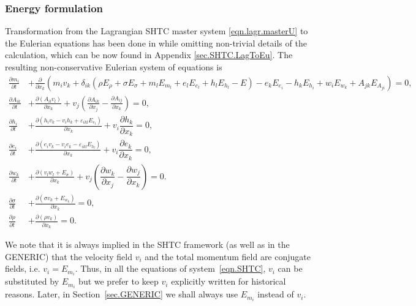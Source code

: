 \documentclass[twoside]{article}
\newcommand{\ted}{E} %
\newcommand{\pd}{\partial}
\begin{document}
\subsubsection{Energy formulation}

Transformation from the Lagrangian SHTC master system 
\eqref{eqn.lagr.masterU} to the Eulerian equations has been done in 
\cite{GodRom1996a} while omitting non-trivial details of the calculation, which 
can be now
found in Appendix \ref{sec.SHTC.LagToEu}. The resulting non-conservative 
Eulerian system of 
equations is
\begin{subequations}\label{eqn.SHTC}
	\begin{align}
	\frac{\pd m_i }{\pd t} & + \frac{\pd }{\pd 
	x_k}\left(m_i v_k + \delta_{ik} \left( \rho \ted_\rho  + \sigma \ted_\sigma 
	+ m_l\ted_{m_l} + e_l 
	\ted_{e_l} + h_{l} \ted_{h_l} - \ted \right) - e_k 
	\ted_{e_i} -  h_{k} \ted_{h_i} + w_i\ted_{w_k} + 
	 A_{jk}\ted_{A_{ji}}\right)=0, \label{eqn.SHTC.momentum}\\[2mm]
%	 
	\frac{\pd A_{i k}}{\pd t} & + \frac{\pd (A_{il} 
	v_l)}{\pd x_k} + v_j\left(\frac{\pd A_{ik}}{\pd 
	x_j}-\frac{\pd A_{ij}}{\pd x_k}\right)
	= 0,\label{eqn.SHTC.A}\\[2mm]
%	
	\frac{\pd h_i}{\pd t} & + \frac{\pd \left( h_i 
	v_k - v_i h_k + \varepsilon_{ikl} \ted_{e_l} \right)}{\pd x_k} + 
	v_i\dfrac{\pd h_k}{\pd x_k} = 0, \label{eqn.SHTC.Hfield}\\[2mm]
%	
	\frac{\pd e_i}{\pd t} & + \frac{\pd \left( e_i 
	v_k - v_i e_k - \varepsilon_{ikl} \ted_{h_l} \right)}{\pd x_k} + 
	v_i\dfrac{\pd e_k}{\pd x_k} = 0, 
	\label{eqn.SHTC.Efield}\\[2mm]
%	
	\frac{\pd w_k}{\pd t} & + \frac{\pd \left(v_l w_l 
	+ \ted_{\sigma}\right)}{\pd x_k} + v_j\left(\dfrac{\pd 
	w_k}{\pd x_j}-\dfrac{\pd w_j}{\pd x_k}\right)=0.
	\label{eqn.SHTC.w}\\[2mm]
%
	\frac{\pd \sigma}{\pd t} & + \frac{\pd 
	\left(\sigma v_k + \ted_{w_k} \right)}{\pd 
	x_k}= 0,	\label{eqn.SHTC.entropy}\\[2mm]
%
	\frac{\pd \rho}{\pd t} & + \frac{\pd (\rho v_k) }{\pd x_k}=0.
	\label{eqn.SHTC.rho}
	\end{align}
\end{subequations}

We note that it is always implied in the SHTC framework (as well as in 
the GENERIC) that the velocity field $ v_i $ and the total momentum field are 
conjugate fields, i.e. $ v_i = \ted_{m_i} $. Thus, in all the equations of 
system~\eqref{eqn.SHTC}, $ v_i $ can be substituted by $ \ted_{m_i} $ but we 
prefer to keep $ v_i $ explicitly written for historical reasons. Later, in 
Section~\ref{sec.GENERIC} we shall always use $ E_{m_i} $ instead of $ v_i $.
\end{document}
